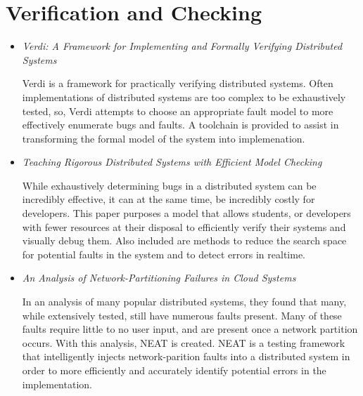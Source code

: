 \documentclass{article}
\begin{document}
\tableofcontents{}

\section{Verification and Checking}

\begin{itemize}

	\subsection{Analysis and Checking Frameworks}
	
	\item
	\textit{Verdi: A Framework for Implementing and Formally Verifying Distributed Systems} \cite{Verdi}

	Verdi is a framework for practically verifying distributed systems. Often implementations of distributed systems are
	too complex to be exhaustively tested, so, Verdi attempts to choose an appropriate fault model to more effectively enumerate bugs and faults.
	A toolchain is provided to assist in transforming the formal model of the system into implemenation.

	\item
	\textit{Teaching Rigorous Distributed Systems with Efficient Model Checking} \cite{MichaelWAET2019}

	While exhaustively determining bugs in a distributed system can be incredibly effective, it can at the same time, be incredibly costly for developers.
	This paper purposes a model that allows students, or developers with fewer resources at their disposal to efficiently verify their systems and visually debug them.
	Also included are methods to reduce the search space for potential faults in the system and to detect errors in realtime.

	\item
	\textit{An Analysis of Network-Partitioning Failures in Cloud Systems} \cite{NEAT}

	In an analysis of many popular distributed systems, they found that many, while extensively tested, still have numerous faults present.
	Many of these faults require little to no user input, and are present once a network partition occurs. With this analysis, NEAT is created.
	NEAT is a testing framework that intelligently injects network-parition faults into a distributed system in order to more efficiently and accurately identify potential errors in the implementation.


\end{itemize}
\end{document}
